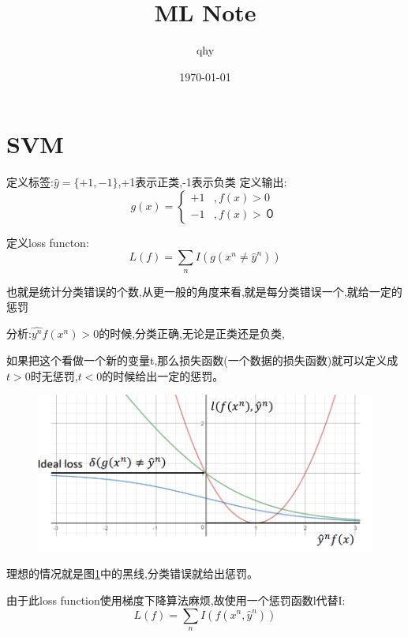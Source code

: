 \documentclass[UTF8,a4paper]{ctexart}
\author{qhy}
\date{\today}
\title{ML Note}
\begin{document}
    \maketitle
    \tableofcontents
    \newpage
    \section{SVM}
    定义标签:$\hat{y} = \{+1,-1\}$,+1表示正类,-1表示负类
    定义输出:
    \begin{equation}
        g(x) = \left \{
            \begin{array}{ll}
                +1 & ,f(x) > 0 \\
                -1  & ,f(x) >０
            \end{array} \right .
    \end{equation}

    定义loss functon:
    \begin{equation}
        L(f) = \sum_n I(g(x^n \neq \hat{y}^n))
    \end{equation}

    也就是统计分类错误的个数,从更一般的角度来看,就是每分类错误一个,就给一定的惩罚

    分析:$\hat{y^n}f(x^n)>0$的时候,分类正确,无论是正类还是负类,

    如果把这个看做一个新的变量t,那么损失函数(一个数据的损失函数)就可以定义成$t>0$时无惩罚,$t<0$的时候给出一定的惩罚。

    \begin{figure}[H]
        \centering
        \includegraphics[scale = 0.3]{assets/ML_1a136.png}
        \label{figlossfunction}
    \end{figure}

    理想的情况就是图\ref{figlossfunction}中的黑线,分类错误就给出惩罚。

    由于此loss function使用梯度下降算法麻烦,故使用一个惩罚函数l代替I:
    \begin{equation}
        L(f) = \sum_n I(f(x^n , \hat y^n))
    \end{equation}
\end{document}
